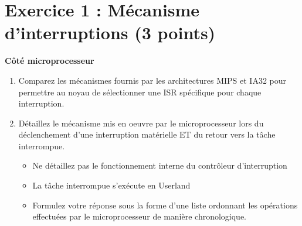 \section*{Exercice 1 : M\'ecanisme d'interruptions (3 points)}

{\bf C\^ot\'e microprocesseur}

\begin{enumerate}
\item Comparez les m\'ecanismes fournis par les architectures MIPS et IA32 pour permettre au noyau de s\'electionner une ISR sp\'ecifique pour chaque interruption.
\item D\'etaillez le m\'ecanisme mis en oeuvre par le microprocesseur lors du d\'eclenchement d'une interruption mat\'erielle ET du retour vers la t\^ache interrompue.

\begin{itemize}
\item Ne d\'etaillez pas le fonctionnement interne du contr\^oleur d'interruption
\item La t\^ache interrompue s'ex\'ecute en Userland
\item Formulez votre r\'eponse sous la forme d'une liste ordonnant les op\'erations effectu\'ees par le microprocesseur de mani\`ere chronologique.
\end{itemize}

\end{enumerate}

